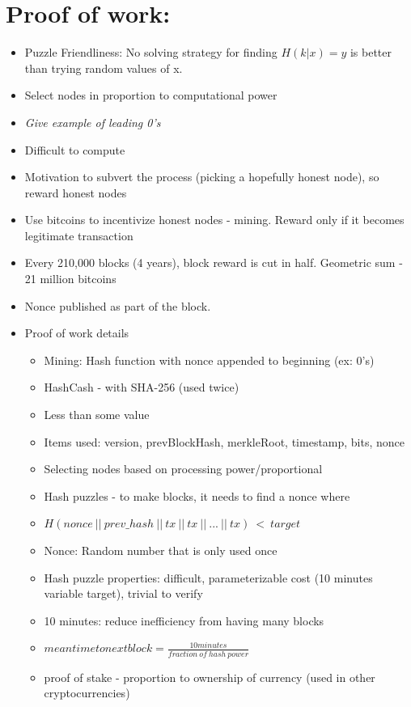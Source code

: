 \documentclass{article}
\begin{document}
\section*{Proof of work:}
\begin{itemize}
  \item Puzzle Friendliness: No solving strategy for finding $H(k | x)=y$ is better than trying random values of x.
  \item Select nodes in proportion to computational power
  \item \emph{Give example of leading 0's}
  \item Difficult to compute
  \item Motivation to subvert the process (picking a hopefully honest node), so reward honest nodes
  \item Use bitcoins to incentivize honest nodes - mining. Reward only if it becomes legitimate transaction
  \item Every 210,000 blocks (4 years), block reward is cut in half. Geometric sum - 21 million bitcoins
  \item Nonce published as part of the block.
  \item Proof of work details
    \begin{itemize}
      \item Mining: Hash function with nonce appended to beginning (ex: 0's)
      \item HashCash - with SHA-256 (used twice)
      \item Less than some value
      \item Items used: version, prevBlockHash, merkleRoot, timestamp, bits, nonce
      \item Selecting nodes based on processing power/proportional
      \item Hash puzzles - to make blocks, it needs to find a nonce where
      \item $ H(nonce\ ||\ prev\_hash\ ||\ tx\ ||\ tx\ ||\ ...\ ||\ tx)\ <\ target $
      \item Nonce: Random number that is only used once
      \item Hash puzzle properties: difficult, parameterizable cost (10 minutes variable target), trivial to verify
      \item 10 minutes: reduce inefficiency from having many blocks
      \item $ mean time to next block = \frac{10 minutes}{fraction\ of\ hash\ power} $
      \item proof of stake - proportion to ownership of currency (used in other cryptocurrencies)

\end{itemize}
\end{itemize}
\end{document}
